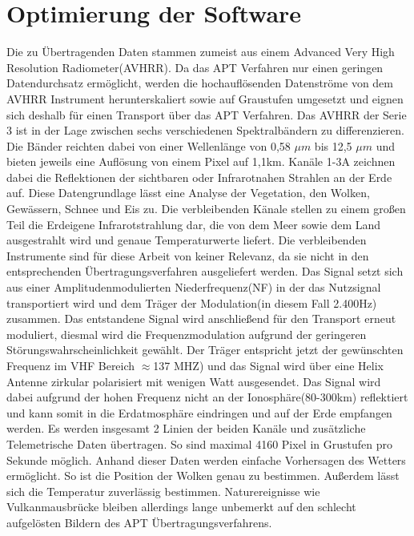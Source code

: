 \section[]{Optimierung der Software}
\begin{multicols*}{2}
    Die zu Übertragenden Daten stammen zumeist aus einem \glqq Advanced Very High Resolution Radiometer\grqq (AVHRR). Da das APT Verfahren nur einen geringen Datendurchsatz ermöglicht, werden die hochauflösenden Datenströme von dem AVHRR Instrument herunterskaliert sowie auf Graustufen umgesetzt und eignen sich deshalb für einen Transport über das APT Verfahren.  Das AVHRR der Serie 3 ist in der Lage zwischen sechs verschiedenen Spektralbändern zu differenzieren. Die Bänder reichten dabei von einer Wellenlänge von 0,58 \( \mu m\) bis 12,5 \( \mu m\) und bieten jeweils eine Auflösung von einem Pixel auf 1,1km. Kanäle 1-3A zeichnen dabei die Reflektionen der sichtbaren oder Infrarotnahen Strahlen an der Erde auf. Diese Datengrundlage lässt eine Analyse der Vegetation, den Wolken, Gewässern, Schnee und Eis zu. Die verbleibenden Känale stellen zu einem großen Teil die Erdeigene Infrarotstrahlung dar, die von dem Meer sowie dem Land ausgestrahlt wird und genaue Temperaturwerte liefert. Die verbleibenden Instrumente sind für diese Arbeit von keiner Relevanz, da sie nicht in den entsprechenden Übertragungsverfahren ausgeliefert werden. 
    \cite{Apt-System} 
    Das Signal setzt sich aus einer Amplitudenmodulierten Niederfrequenz(NF) in der das Nutzsignal transportiert wird und dem Träger der Modulation(in diesem Fall 2.400Hz) zusammen. Das entstandene Signal wird anschließend für den Transport erneut moduliert, diesmal wird  die Frequenzmodulation aufgrund der geringeren Störungswahrscheinlichkeit gewählt. Der Träger entspricht jetzt der gewünschten Frequenz im VHF Bereich \( \approx  \)137 MHZ) und das Signal wird über eine Helix Antenne zirkular polarisiert mit wenigen Watt ausgesendet. Das Signal wird dabei aufgrund der hohen Frequenz nicht an der Ionosphäre(80-300km) reflektiert und kann somit in die Erdatmosphäre eindringen und auf der Erde empfangen werden. Es werden insgesamt 2 Linien der beiden Kanäle und zusätzliche Telemetrische Daten übertragen. So sind maximal 4160 Pixel in Grustufen pro Sekunde möglich. Anhand dieser Daten werden einfache Vorhersagen des Wetters ermöglicht. So ist die Position der Wolken genau zu bestimmen. Außerdem lässt sich die Temperatur zuverlässig bestimmen. Naturereignisse wie Vulkanmausbrücke bleiben allerdings lange unbemerkt auf den schlecht aufgelösten Bildern des APT Übertragungsverfahrens. 

\end{multicols*}
